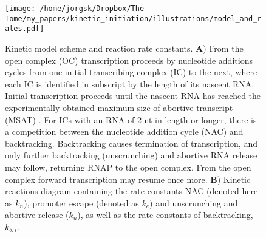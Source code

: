 \begin{figure}
	\begin{center}
        \texttt{[image: /home/jorgsk/Dropbox/The-Tome/my\_papers/kinetic\_initiation/illustrations/model\_and\_rates.pdf]}
	\end{center}
    \caption{Kinetic model scheme and reaction rate constants. \textbf{A})
    From the open complex (OC) transcription proceeds by nucleotide additions
    cycles from one initial transcribing complex (IC) to the next, where each
    IC is identified in subscript by the length of its nascent RNA. Initial
    transcription proceeds until the nascent RNA has reached the
    experimentally obtained maximum size of abortive transcript (MSAT)
    \cite{hsu_initial_2006}. For ICs with an RNA of 2 nt in length or longer, there is a
    competition between the nucleotide addition cycle (NAC) and backtracking.
    Backtracking causes termination of transcription, and only further
    backtracking (unscrunching) and abortive RNA release may follow, returning
    RNAP to the open complex. From the open complex forward transcription may
    resume once more. \textbf{B}) Kinetic reactions diagram containing the
    rate constants NAC (denoted here as $k_n$), promoter escape (denoted as
    $k_e$) and unscrunching and abortive release ($k_u$), as well as the rate
    constants of backtracking, $k_{b,i}$.}
    \label{fig:model_and_rates}
\end{figure}
